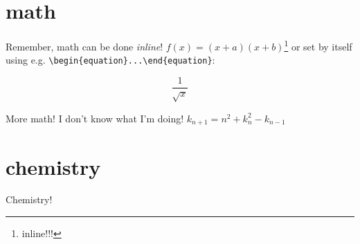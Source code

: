 \documentclass{article}
\begin{document}
\section{math}
Remember, math can be done \textit{inline}! $f(x)=(x+a)(x+b)$\footnote{inline!!!} or set by itself using e.g. \verb|\begin{equation}...\end{equation}|:

\begin{equation*} %
	 \frac{1}{\sqrt{x}}
\end{equation*}

More math! I don't know what I'm doing! $k_{n+1} = n^2 + k_n^2 - k_{n-1}$




\section{chemistry}
Chemistry!







\end{document}
